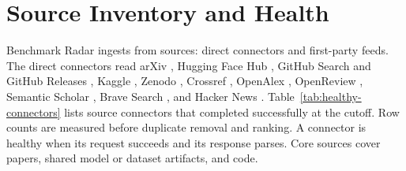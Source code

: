 \documentclass[11pt]{article}
\begin{document}
\section{Source Inventory and Health}
\label{app:source-inventory}

Benchmark Radar ingests from \ReportIngestSourceCount{} sources: \ReportConnectorCount{} direct connectors and \ReportFirstPartyFeedCount{} first-party feeds. The direct connectors read arXiv \citep{arxivapi}, Hugging Face Hub \citep{huggingfacehub}, GitHub Search and GitHub Releases \citep{githubsearchdocs,githubreleasesdocs}, Kaggle \citep{kaggleapi}, Zenodo \citep{zenodoapi}, Crossref \citep{crossrefapi}, OpenAlex \citep{priem2022openalex}, OpenReview \citep{openreview}, Semantic Scholar \citep{kinney2023semanticscholar}, Brave Search \citep{bravesearchapi}, and Hacker News \citep{hnalgoliaapi}. Table~\ref{tab:healthy-connectors} lists source connectors that completed successfully at the cutoff. Row counts are measured before duplicate removal and ranking. A connector is healthy when its request succeeds and its response parses. Core sources cover papers, shared model or dataset artifacts, and code.
\end{document}
